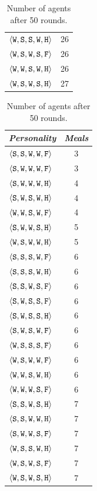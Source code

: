 \begin{table}
{{\begin{minipage}[b]{0.42\hsize}
\begin{tabular}{ l | c }
					$\personality{W}{S}{S}{W}{H}$ & 26\\
					$\personality{W}{S}{W}{S}{F}$ & 26\\
					$\personality{W}{W}{S}{W}{H}$ & 26\\
					$\personality{W}{S}{W}{S}{H}$ & 27\\
				\end{tabular}
				\caption{Number of agents after 50 rounds.}
				\label{tab:numAgents}
			\end{minipage}
			\hfill
			\begin{minipage}[b]{0.42\hsize}\centering
				\begin{tabular}{ l | c }
					\emph{Personality} & \emph{Meals} \\
					\hline
					$\personality{S}{S}{W}{W}{F}$ & 3\\
					$\personality{S}{W}{W}{W}{F}$ & 3\\
					$\personality{S}{W}{W}{W}{H}$ & 4\\
					$\personality{S}{W}{S}{W}{H}$ & 4\\
					$\personality{W}{W}{S}{W}{F}$ & 4\\
					$\personality{S}{W}{W}{S}{H}$ & 5\\
					$\personality{W}{S}{W}{W}{H}$ & 5\\
					$\personality{S}{S}{S}{W}{F}$ & 6\\
					$\personality{S}{S}{S}{W}{H}$ & 6\\
					$\personality{S}{S}{W}{S}{F}$ & 6\\
					$\personality{S}{W}{S}{S}{F}$ & 6\\
					$\personality{S}{W}{S}{S}{H}$ & 6\\
					$\personality{S}{W}{S}{W}{F}$ & 6\\
					$\personality{W}{S}{S}{S}{F}$ & 6\\
					$\personality{W}{S}{W}{W}{F}$ & 6\\
					$\personality{W}{W}{S}{W}{H}$ & 6\\
					$\personality{W}{W}{W}{S}{F}$ & 6\\
					$\personality{S}{S}{W}{S}{H}$ & 7\\
					$\personality{S}{S}{W}{W}{H}$ & 7\\
					$\personality{S}{W}{W}{S}{F}$ & 7\\
					$\personality{W}{S}{S}{W}{H}$ & 7\\
					$\personality{W}{S}{W}{S}{F}$ & 7\\
					$\personality{W}{S}{W}{S}{H}$ & 7\\

\end{tabular}
\end{minipage}}}
\end{table}
